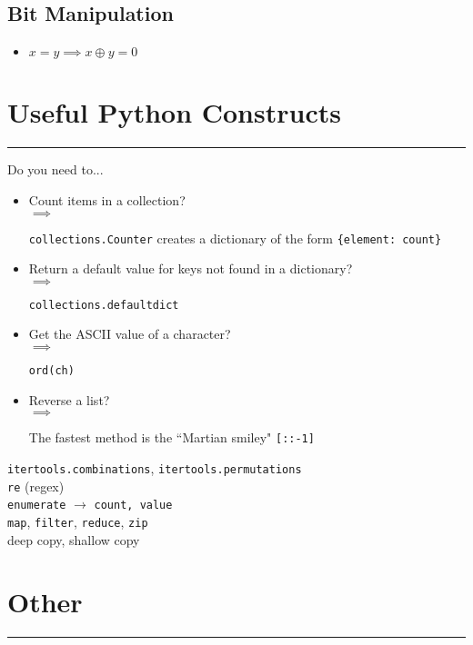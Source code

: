 \documentclass[12pt]{article}
\newcommand{\imply}[1]{
  \-\hspace{1em}$\implies$ \parbox[t]{11.2cm}{#1}
}
\begin{document}
\subsection*{Bit Manipulation}

\begin{adjustwidth}{2em}{0pt}
\begin{itemize}
  \item $x = y \implies x \oplus y = 0$
\end{itemize}
\end{adjustwidth}

\section*{Useful Python Constructs}
\hrule\vspace{5ex}

Do you need to...
\begin{itemize}
  \item Count items in a collection? \smallskip\\
    \imply{\texttt{collections.Counter} creates a dictionary of the form \texttt{\{element: count\}}}
  \item Return a default value for keys not found in a dictionary? \smallskip\\
    \imply{\texttt{collections.defaultdict}}
  \item Get the ASCII value of a character? \smallskip\\
    \imply{\texttt{ord(ch)}}
  \item Reverse a list? \smallskip\\
    \imply{The fastest method is the ``Martian smiley" \texttt{[::-1]}}
\end{itemize}

\texttt{itertools.combinations}, \texttt{itertools.permutations} \\
\texttt{re} (regex) \\
\texttt{enumerate} $\rightarrow$ \texttt{count, value} \\
\texttt{map}, \texttt{filter}, \texttt{reduce}, \texttt{zip} \\
deep copy, shallow copy

\section*{Other}
\hrule\vspace{5ex}
\end{document}
